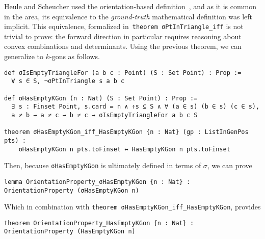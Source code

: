 





Heule and Scheucher used the orientation-based definition~\cite{emptyHexagonNumber}, and as it is common in the area, its equivalence to the \emph{ground-truth} mathematical definition was left implicit.
This equivalence, formalized in~\lstinline|theorem σPtInTriangle_iff| is not trivial to prove:
the forward direction in particular requires reasoning about convex combinations and determinants.
Using the previous theorem, we can generalize to $k$-gons as follows.
\begin{lstlisting}
def σIsEmptyTriangleFor (a b c : Point) (S : Set Point) : Prop :=
  ∀ s ∈ S, ¬σPtInTriangle s a b c

def σHasEmptyKGon (n : Nat) (S : Set Point) : Prop :=
  ∃ s : Finset Point, s.card = n ∧ ↑s ⊆ S ∧ ∀ (a ∈ s) (b ∈ s) (c ∈ s), 
  a ≠ b → a ≠ c → b ≠ c → σIsEmptyTriangleFor a b c S

theorem σHasEmptyKGon_iff_HasEmptyKGon {n : Nat} (gp : ListInGenPos pts) :
    σHasEmptyKGon n pts.toFinset ↔ HasEmptyKGon n pts.toFinset
\end{lstlisting}

Then, because \lstinline|σHasEmptyKGon| is ultimately defined in terms of $\sigma$, we can prove
\begin{lstlisting}
lemma OrientationProperty_σHasEmptyKGon {n : Nat} : OrientationProperty (σHasEmptyKGon n)
\end{lstlisting}
Which in combination with \lstinline|theorem σHasEmptyKGon_iff_HasEmptyKGon|, provides
\begin{lstlisting}
theorem OrientationProperty_HasEmptyKGon {n : Nat} : OrientationProperty (HasEmptyKGon n)
\end{lstlisting}


